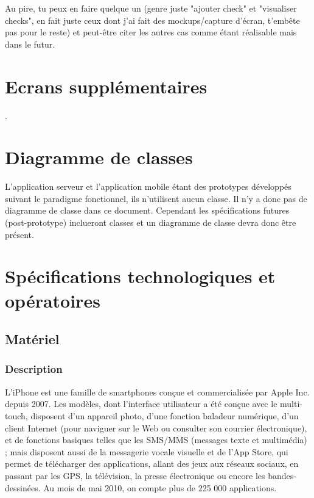 \documentclass[a4paper,12pt]{report}
\begin{document}
\begin{onehalfspace}
Au pire, tu peux en faire quelque un (genre juste "ajouter check" et "visualiser checks", en fait juste ceux dont j'ai fait des mockups/capture d'écran, t'embête pas pour le reste) et peut-être citer les autres cas comme étant réalisable mais dans le futur.

\chapter{Ecrans supplémentaires} %
\label{cha:ecrans_suppl_mentaires}
.

\chapter{Diagramme de classes} %
\label{cha:diagramme_de_classes}

L'application serveur et l'application mobile étant des prototypes développés suivant le paradigme fonctionnel, ils n'utilisent aucun classe. Il n'y a donc pas de diagramme de classe dans ce document. Cependant les spécifications futures (post-prototype) inclueront classes et un diagramme de classe devra donc être présent.

\chapter{Spécifications technologiques et opératoires}


\section{Matériel}
\subsection{Description}
L'iPhone  est une famille de smartphones conçue et commercialisée par Apple Inc. depuis 2007. Les modèles, dont l'interface utilisateur a été conçue avec le multi-touch, disposent d'un appareil photo, d'une fonction baladeur numérique, d'un client Internet (pour naviguer sur le Web ou consulter son courrier électronique), et de fonctions basiques telles que les SMS/MMS (messages texte et multimédia) ; mais disposent aussi de la messagerie vocale visuelle et de l'App Store, qui permet de télécharger des applications, allant des jeux aux réseaux sociaux, en passant par les GPS, la télévision, la presse électronique ou encore les bandes-dessinées. Au mois de mai 2010, on compte plus de 225 000 applications.


\end{onehalfspace}
\end{document}
